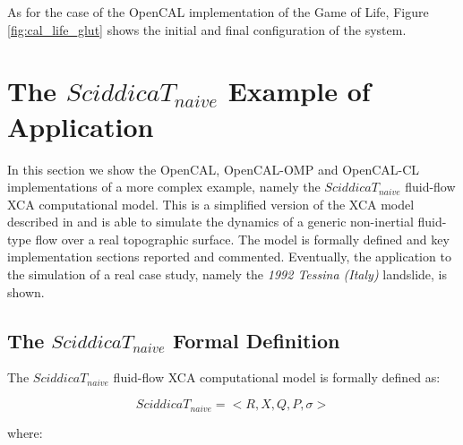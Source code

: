 

As for the case of the OpenCAL implementation of the Game of
Life, Figure \ref{fig:cal_life_glut} shows the initial and final
configuration of the system.


\section{The $SciddicaT_{naive}$ Example of Application}
\label{sec:SciddicaT-naive}

In this section we show the OpenCAL, OpenCAL-OMP and OpenCAL-CL
implementations of a more complex example, namely the
$SciddicaT_{naive}$ fluid-flow XCA computational model. This is a
simplified version of the XCA model described in
\cite{avolio2000simulation} and is able to simulate the dynamics of
a generic non-inertial fluid-type flow over a real topographic
surface. The model is formally defined and key implementation
sections reported and commented. Eventually, the application to the
simulation of a real case study, namely the \textit{1992 Tessina (Italy)}
landslide, is shown.

\subsection{The $SciddicaT_{naive}$ Formal Definition}
The $SciddicaT_{naive}$ fluid-flow XCA computational model is
formally defined as:

$$SciddicaT_{naive} = < R, X, Q , P, \sigma >$$

where:

